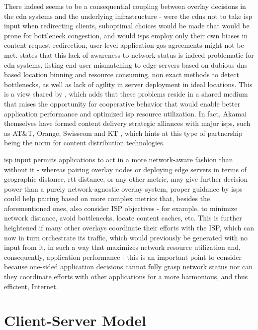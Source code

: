     There indeed seems to be a consequential coupling between overlay decisions in the \gls{cdn} systems and the underlying infrastructure - were the \glspl{cdn} not to take \gls{isp} input when redirecting clients, suboptimal choices would be made that would be prone for bottleneck congestion, and would \glspl{isp} employ only their own biases in content request redirection, user-level application \gls{gos} agreements might not be met.
        \cite{pushing-cdn-isp-collaboration} states that this lack of awareness to network status is indeed problematic for \gls{cdn} systems, listing end-user mismatching to edge servers based on dubious \gls{dns}-based location binning and resource consuming, non exact methods to detect bottlenecks, as well as lack of agility in server deployment in ideal locations.
        This is a view shared by \cite{cdn-isp-cooperations}, which adds that these problems reside in a shared medium that raises the opportunity for cooperative behavior that would enable better application performance and optimized \gls{isp} resource utilization.
        In fact, Akamai themselves have formed content delivery strategic alliances with major \glspl{isp}, such as AT\&T, Orange, Swisscom and KT \cite{pushing-cdn-isp-collaboration}, which hints at this type of partnership being the norm for content distribution technologies. 

        \gls{isp} input permits applications to act in a more network-aware fashion than without it - whereas pairing overlay nodes or deploying edge servers in terms of geographic distance, \gls{rtt} distance, or any other metric, may give further decision power than a purely network-agnostic overlay system, proper guidance by \glspl{isp} could help pairing based on more complex metrics that, besides the aforementioned ones, also consider ISP objectives - for example, to minimize network distance, avoid bottlenecks, locate content caches, etc.
        This is further heightened if many other overlays coordinate their efforts with the ISP, which can now in turn orchestrate its traffic, which would previously be generated with no input from it, in such a way that maximizes network resource utilization and, consequently, application performance - this is an important point to consider because one-sided application decisions cannot fully grasp network status nor can they coordinate efforts with other applications for a more harmonious, and thus efficient, Internet.


\section{Client-Server Model}

